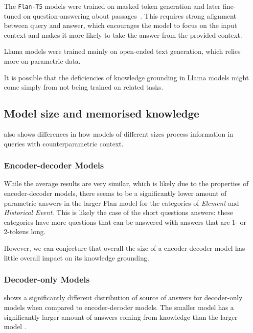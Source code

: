 The \texttt{Flan-T5} models were trained on masked token generation and later fine-tuned on question-answering about passages~\cite{flant5}.
This requires strong alignment between query and answer, which encourages the model to focus on the input context and makes it more likely to take the answer from the provided context.

Llama models were trained mainly on open-ended text generation, which relies more on parametric data.

It is possible that the deficiencies of knowledge grounding in Llama models might come simply from not being trained on related tasks.

\subsection{Model size and memorised knowledge}
\label{model_size_parametric}

 also shows differences in how models of different sizes process information in queries with counterparametric context.

\subsubsection{Encoder-decoder Models}

While the average results are very similar, which is likely due to the properties of encoder-decoder models, there seems to be a significantly lower amount of parametric answers in the larger Flan model for the categories of \emph{Element} and \emph{Historical Event}.
This is likely the case of the short questions answers: these categories have more questions that can be answered with answers that are 1- or 2-tokens long.

However, we can conjecture that overall the size of a encoder-decoder model has little overall impact on its knowledge grounding.

\subsubsection{Decoder-only Models}

 shows a significantly different distribution of source of answers for decoder-only models when compared to encoder-decoder models.
The smaller model \smallllama{} has a significantly larger amount of answers coming from \Contextual{} knowledge than the larger model \bigllama{}.

